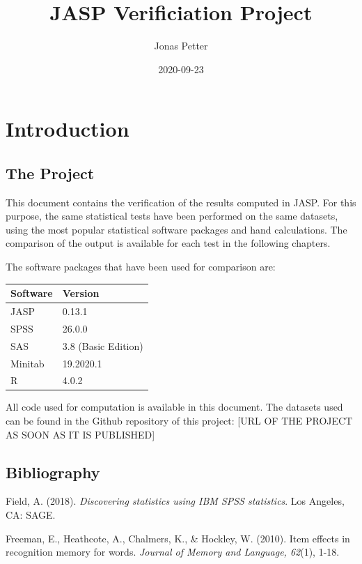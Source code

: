 \documentclass[
]{book}
\title{JASP Verificiation Project}
\author{Jonas Petter}
\date{2020-09-23}
\begin{document}
\maketitle

{
\setcounter{tocdepth}{1}
\tableofcontents
}
\hypertarget{introduction}{%
\chapter{Introduction}\label{introduction}}

\hypertarget{the-project}{%
\section{The Project}\label{the-project}}

This document contains the verification of the results computed in JASP. For this purpose, the same statistical tests have been performed on the same datasets, using the most popular statistical software packages and hand calculations. The comparison of the output is available for each test in the following chapters.

The software packages that have been used for comparison are:

\begin{tabular}{ll}
\toprule
Software & Version\\
\midrule
JASP & 0.13.1\\
SPSS & 26.0.0\\
SAS & 3.8 (Basic Edition)\\
Minitab & 19.2020.1\\
R & 4.0.2\\
\bottomrule
\end{tabular}

All code used for computation is available in this document. The datasets used can be found in the Github repository of this project: {[}URL OF THE PROJECT AS SOON AS IT IS PUBLISHED{]}

\hypertarget{bibliography}{%
\section{Bibliography}\label{bibliography}}

Field, A. (2018). \emph{Discovering statistics using IBM SPSS statistics}. Los Angeles, CA: SAGE.

Freeman, E., Heathcote, A., Chalmers, K., \& Hockley, W. (2010). Item effects in recognition memory for words. \emph{Journal of Memory and Language, 62}(1), 1-18.
\end{document}
